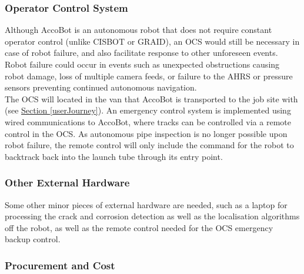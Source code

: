 \documentclass[11pt]{article}		%
\newcommand{\sectref}[1]{\hyperref[#1]{Section \ref*{#1}}}     %
\begin{document}
		\subsubsection{Operator Control System}
		
        Although AccoBot is an autonomous robot that does not require constant operator control (unlike CISBOT or GRAID), an OCS would still be necessary in case of robot failure, and also facilitate response to other unforeseen events. Robot failure could occur in events such as unexpected obstructions causing robot damage, loss of multiple camera feeds, or failure to the AHRS or pressure sensors preventing continued autonomous navigation.
        \\
        \hspace*{3ex}The OCS will located in the van that AccoBot is transported to the job site with (see \sectref{userJourney}). An emergency control system is implemented using wired communications to AccoBot, where tracks can be controlled via a remote control in the OCS. As autonomous pipe inspection is no longer possible upon robot failure, the remote control will only include the command for the robot to backtrack back into the launch tube through its entry point.
        
    \subsubsection{Other External Hardware}
    
    Some other minor pieces of external hardware are needed, such as a laptop for processing the crack and corrosion detection as well as the localisation algorithms off the robot, as well as the remote control needed for the OCS emergency backup control. 
    
    \subsubsection{Procurement and Cost}
    
\end{document}
